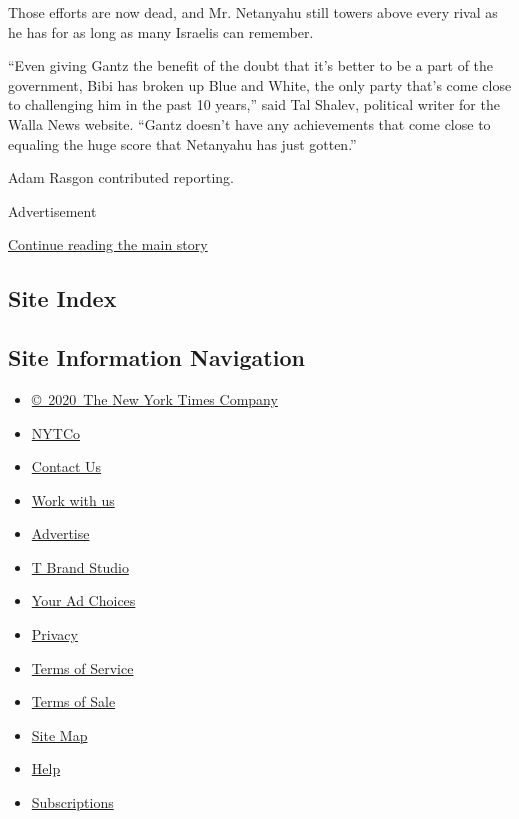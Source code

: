 Those efforts are now dead, and Mr. Netanyahu still towers above every
rival as he has for as long as many Israelis can remember.

``Even giving Gantz the benefit of the doubt that it's better to be a
part of the government, Bibi has broken up Blue and White, the only
party that's come close to challenging him in the past 10 years,'' said
Tal Shalev, political writer for the Walla News website. ``Gantz doesn't
have any achievements that come close to equaling the huge score that
Netanyahu has just gotten.''

Adam Rasgon contributed reporting.

Advertisement

\protect\hyperlink{after-bottom}{Continue reading the main story}

\hypertarget{site-index}{%
\subsection{Site Index}\label{site-index}}

\hypertarget{site-information-navigation}{%
\subsection{Site Information
Navigation}\label{site-information-navigation}}

\begin{itemize}
\tightlist
\item
  \href{https://help.nytimes3xbfgragh.onion/hc/en-us/articles/115014792127-Copyright-notice}{©~2020~The
  New York Times Company}
\end{itemize}

\begin{itemize}
\tightlist
\item
  \href{https://www.nytco.com/}{NYTCo}
\item
  \href{https://help.nytimes3xbfgragh.onion/hc/en-us/articles/115015385887-Contact-Us}{Contact
  Us}
\item
  \href{https://www.nytco.com/careers/}{Work with us}
\item
  \href{https://nytmediakit.com/}{Advertise}
\item
  \href{http://www.tbrandstudio.com/}{T Brand Studio}
\item
  \href{https://www.nytimes3xbfgragh.onion/privacy/cookie-policy\#how-do-i-manage-trackers}{Your
  Ad Choices}
\item
  \href{https://www.nytimes3xbfgragh.onion/privacy}{Privacy}
\item
  \href{https://help.nytimes3xbfgragh.onion/hc/en-us/articles/115014893428-Terms-of-service}{Terms
  of Service}
\item
  \href{https://help.nytimes3xbfgragh.onion/hc/en-us/articles/115014893968-Terms-of-sale}{Terms
  of Sale}
\item
  \href{https://spiderbites.nytimes3xbfgragh.onion}{Site Map}
\item
  \href{https://help.nytimes3xbfgragh.onion/hc/en-us}{Help}
\item
  \href{https://www.nytimes3xbfgragh.onion/subscription?campaignId=37WXW}{Subscriptions}
\end{itemize}
